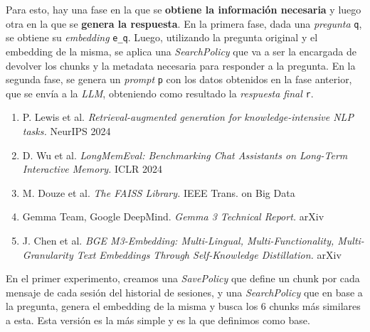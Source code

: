 \documentclass[portrait,paperwidth=84.1cm,paperheight=118.9cm]{baposter}
\begin{document}
\begin{poster}
{Para esto, hay una fase en la que se \textbf{obtiene la información necesaria} y luego otra en la que se \textbf{genera la respuesta}. En la primera fase, dada una \textit{pregunta} \texttt{q}, se obtiene su \textit{embedding} \texttt{e\_q}. Luego, utilizando la pregunta original y el embedding de la misma, se aplica una \textit{SearchPolicy} que va a ser la encargada de devolver los chunks y la metadata necesaria para responder a la pregunta. En la segunda fase, se genera un \textit{prompt} \texttt{p} con los datos obtenidos en la fase anterior, que se envía a la \textit{LLM}, obteniendo como resultado la \textit{respuesta final} \texttt{r}.
\\
}


{
{\small
\begin{minipage}{0.46\columnwidth}
\begin{enumerate}
\item P. Lewis et al. {\it Retrieval-augmented generation for knowledge-intensive NLP tasks.} NeurIPS 2024
\item D. Wu et al. {\it LongMemEval: Benchmarking Chat Assistants on Long-Term Interactive Memory.} ICLR 2024
\item M. Douze et al. {\it The FAISS Library.} IEEE Trans. on Big Data
\end{enumerate}
\end{minipage}
\begin{minipage}{0.46\columnwidth}
\begin{enumerate}
\setcounter{enumi}{3}
\item Gemma Team, Google DeepMind. {\it Gemma 3 Technical Report.} arXiv
\item J. Chen et al. {\it BGE M3-Embedding: Multi-Lingual, Multi-Functionality, Multi-Granularity Text Embeddings Through Self-Knowledge Distillation.} arXiv
\end{enumerate}
\end{minipage}
}
}


{
En el primer experimento, creamos una \textit{SavePolicy} que define un chunk por cada mensaje de cada sesión del historial de sesiones, y una \textit{SearchPolicy} que en base a la pregunta, genera el embedding de la misma y busca los 6 chunks más similares a esta. Esta versión es la más simple y es la que definimos como base.

}
\end{poster}
\end{document}
